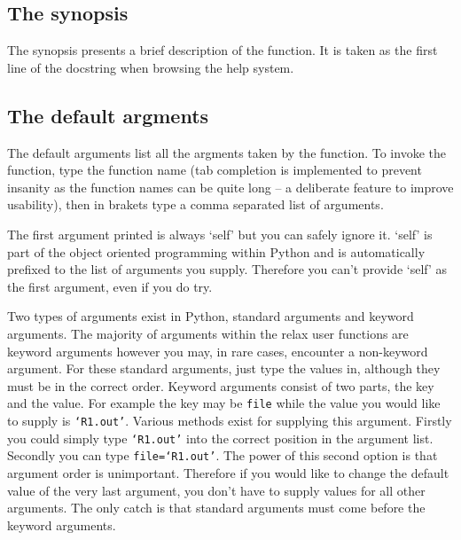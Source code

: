 \subsection{The synopsis}

The synopsis presents a brief description of the function.  It is taken as the first line of the docstring when browsing the help system.


\subsection{The default argments}

The default arguments list all the argments taken by the function.  To invoke the function, type the function name (tab completion is implemented to prevent insanity as the function names can be quite long -- a deliberate feature to improve usability), then in brakets type a comma separated list of arguments.

The first argument printed is always `self' but you can safely ignore it.  `self' is part of the object oriented programming within Python and is automatically prefixed to the list of arguments you supply.  Therefore you can't provide `self' as the first argument, even if you do try.

Two types of arguments exist in Python, standard arguments and keyword arguments.  The majority of arguments within the relax user functions are keyword arguments however you may, in rare cases, encounter a non-keyword argument.  For these standard arguments, just type the values in, although they must be in the correct order.  Keyword arguments consist of two parts, the key and the value.  For example the key may be \texttt{file} while the value you would like to supply is \texttt{`R1.out'}.  Various methods exist for supplying this argument.  Firstly you could simply type \texttt{`R1.out'} into the correct position in the argument list.  Secondly you can type \texttt{file=`R1.out'}.  The power of this second option is that argument order is unimportant.  Therefore if you would like to change the default value of the very last argument, you don't have to supply values for all other arguments.  The only catch is that standard arguments must come before the keyword arguments.


\begin{spacedpara}

\end{spacedpara}
